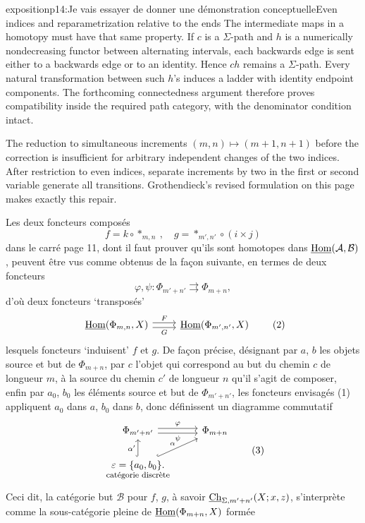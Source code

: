 \begin{dcomment}{exposition}{p14:Je vais essayer de donner une démonstration conceptuelle}{Even indices and reparametrization relative to the ends}
The intermediate maps in a homotopy must have that same property. If $c$ is a $\Sigma$-path and $h$ is a numerically nondecreasing functor between alternating intervals, each backwards edge is sent either to a backwards edge or to an identity. Hence $ch$ remains a $\Sigma$-path. Every natural transformation between such $h$'s induces a ladder with identity endpoint components. The forthcoming connectedness argument therefore proves compatibility inside the required path category, with the denominator condition intact.

The reduction to simultaneous increments $(m,n)\mapsto(m+1,n+1)$ before the correction is insufficient for arbitrary independent changes of the two indices. After restriction to even indices, separate increments by two in the first or second variable generate all transitions. Grothendieck's revised formulation on this page makes exactly this repair.
\end{dcomment}




Les deux foncteurs composés
\[
f=k\circ *_{m,n}\ ,\quad g=*_{m',n'}\circ(i\times j)
\]
dans le carré page 11, dont il faut prouver qu'ils sont homotopes dans $\underline{\mathrm{Hom}}(\mathcal{A},\mathcal{B})$, peuvent être vus comme obtenus de la façon suivante, en termes de deux foncteurs
\[
\varphi,\psi:\Phi_{m'+n'}\rightrightarrows\Phi_{m+n}, \tag*{(1)}
\]
d'où deux foncteurs `transposés'
\[
\begin{tikzcd}
\uHom(\Phi_{m,n},X) \arrow[r,shift left,"F"] \arrow[r,shift right,"G"'] & \uHom(\Phi_{m',n'},X)
\end{tikzcd} \tag*{(2)}
\]
 lesquels foncteurs `induisent' $f$ et $g$. De façon précise, désignant par $a$, $b$ les objets source et but de $\Phi_{m+n}$, par $c$ l'objet qui correspond au but du chemin $c$ de longueur $m$, à la source du chemin $c'$ de longueur $n$ qu'il s'agit de composer, enfin par $a_0$, $b_0$ les éléments source et but de $\Phi_{m'+n'}$, les foncteurs envisagés (1) appliquent $a_0$ dans $a$, $b_0$ dans $b$, donc définissent un diagramme commutatif
\[
\begin{tikzcd}
\Phi_{m'+n'} \arrow[r,shift left,"\varphi"] \arrow[r,shift right,"\psi"'] & \Phi_{m+n} \\
\underset{\text{\footnotesize catégorie discrète}}{\varepsilon=\{a_0,b_0\}.} \arrow[u,hook,"\alpha'"] \arrow[ur,hook,"\alpha"] &
\end{tikzcd} \tag*{(3)}
\]
Ceci dit, la catégorie but $\mathcal{B}$ pour $f$, $g$, à savoir $\underline{\mathrm{Ch}}_{\Sigma,m'+n'}(X;x,z)$, s'interprète comme la sous-catégorie pleine de $\underline{\mathrm{Hom}}(\Phi_{m+n},X)$ formée

